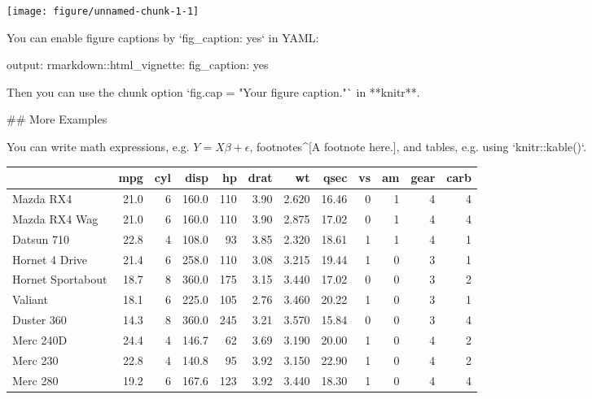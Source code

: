 \begin{knitrout}
\begin{kframe}
{\ttfamily\noindent\itshape\color{messagecolor}{\#\# Mean C-index: 0.738545772360641}}

{\ttfamily\noindent\itshape\color{messagecolor}{\#\# Seed 99}}

{\ttfamily\noindent\itshape\color{messagecolor}{\#\# 0.717607223476298 0.748750567923671 0.662979683972912}}

{\ttfamily\noindent\itshape\color{messagecolor}{\#\# Mean C-index: 0.73833427186686}}

{\ttfamily\noindent\itshape\color{messagecolor}{\#\# Seed 100}}

{\ttfamily\noindent\itshape\color{messagecolor}{\#\# 0.787797218483625 0.770443793647218 0.714894571556752}}

{\ttfamily\noindent\itshape\color{messagecolor}{\#\# Mean C-index: 0.738828901333027}}\begin{alltt}
\end{alltt}
\end{kframe}
\texttt{[image: figure/unnamed-chunk-1-1]} 

\end{knitrout}

You can enable figure captions by `fig_caption: yes` in YAML:

    output:
      rmarkdown::html_vignette:
        fig_caption: yes

Then you can use the chunk option `fig.cap = "Your figure caption."` in **knitr**.

## More Examples

You can write math expressions, e.g. $Y = X\beta + \epsilon$, footnotes^[A footnote here.], and tables, e.g. using `knitr::kable()`.


\begin{tabular}{l|r|r|r|r|r|r|r|r|r|r|r}
\hline
  & mpg & cyl & disp & hp & drat & wt & qsec & vs & am & gear & carb\\
\hline
Mazda RX4 & 21.0 & 6 & 160.0 & 110 & 3.90 & 2.620 & 16.46 & 0 & 1 & 4 & 4\\
\hline
Mazda RX4 Wag & 21.0 & 6 & 160.0 & 110 & 3.90 & 2.875 & 17.02 & 0 & 1 & 4 & 4\\
\hline
Datsun 710 & 22.8 & 4 & 108.0 & 93 & 3.85 & 2.320 & 18.61 & 1 & 1 & 4 & 1\\
\hline
Hornet 4 Drive & 21.4 & 6 & 258.0 & 110 & 3.08 & 3.215 & 19.44 & 1 & 0 & 3 & 1\\
\hline
Hornet Sportabout & 18.7 & 8 & 360.0 & 175 & 3.15 & 3.440 & 17.02 & 0 & 0 & 3 & 2\\
\hline
Valiant & 18.1 & 6 & 225.0 & 105 & 2.76 & 3.460 & 20.22 & 1 & 0 & 3 & 1\\
\hline
Duster 360 & 14.3 & 8 & 360.0 & 245 & 3.21 & 3.570 & 15.84 & 0 & 0 & 3 & 4\\
\hline
Merc 240D & 24.4 & 4 & 146.7 & 62 & 3.69 & 3.190 & 20.00 & 1 & 0 & 4 & 2\\
\hline
Merc 230 & 22.8 & 4 & 140.8 & 95 & 3.92 & 3.150 & 22.90 & 1 & 0 & 4 & 2\\
\hline
Merc 280 & 19.2 & 6 & 167.6 & 123 & 3.92 & 3.440 & 18.30 & 1 & 0 & 4 & 4\\
\hline
\end{tabular}


